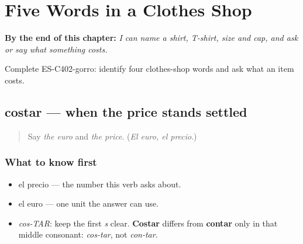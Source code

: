 
\chapter{Five Words in a Clothes Shop}
\label{ch:camisa-camiseta-talla-gorro-costar}

\begin{chapteropening}
\textbf{By the end of this chapter:} \emph{I can name a shirt, T-shirt, size and cap, and ask or say what something costs.}

Complete ES-C402-gorro: identify four clothes-shop words and ask what an item costs.
\end{chapteropening}

\section[costar]{costar — when the price stands settled}

\label{lesson:ES-C402-costar}



\begin{quote}
Say \emph{the euro} and \emph{the price}. (\emph{El euro, el precio}.)
\end{quote}

\subsection*{What to know first}
\begin{itemize}
\raggedright
  \item el precio — the number this verb asks about.
  \item el euro — one unit the answer can use.
\end{itemize}

\begin{sounds}
\begin{itemize}
\raggedright
  \item \emph{cos-TAR}: keep the first \emph{s} clear. \textbf{Costar} differs from \textbf{contar} only in that middle consonant: \emph{cos-tar}, not \emph{con-tar}.
\end{itemize}
\end{sounds}

